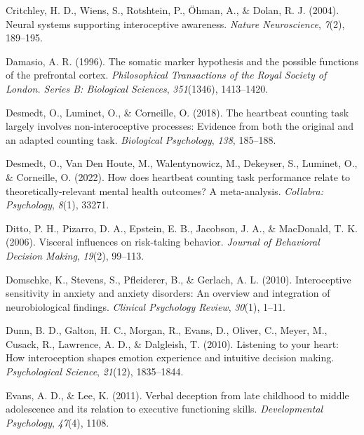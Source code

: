 \documentclass[
  man,mask,floatsintext]{apa6}
\newlength{\cslhangindent}
\newlength{\cslentryspacingunit} %
\newenvironment{CSLReferences}[2] %
 {%
  \setlength{\parindent}{0pt}
  \ifodd #1
  \let\oldpar\par
  \def\par{\hangindent=\cslhangindent\oldpar}
  \fi
  \setlength{\parskip}{#2\cslentryspacingunit}
 }%
 {}
\begin{document}
\begin{CSLReferences}{1}{0}
\leavevmode{}%
Critchley, H. D., Wiens, S., Rotshtein, P., Öhman, A., \& Dolan, R. J. (2004). Neural systems supporting interoceptive awareness. \emph{Nature Neuroscience}, \emph{7}(2), 189--195.

\leavevmode{}%
Damasio, A. R. (1996). The somatic marker hypothesis and the possible functions of the prefrontal cortex. \emph{Philosophical Transactions of the Royal Society of London. Series B: Biological Sciences}, \emph{351}(1346), 1413--1420.

\leavevmode{}%
Desmedt, O., Luminet, O., \& Corneille, O. (2018). The heartbeat counting task largely involves non-interoceptive processes: Evidence from both the original and an adapted counting task. \emph{Biological Psychology}, \emph{138}, 185--188.

\leavevmode{}%
Desmedt, O., Van Den Houte, M., Walentynowicz, M., Dekeyser, S., Luminet, O., \& Corneille, O. (2022). How does heartbeat counting task performance relate to theoretically-relevant mental health outcomes? A meta-analysis. \emph{Collabra: Psychology}, \emph{8}(1), 33271.

\leavevmode{}%
Ditto, P. H., Pizarro, D. A., Epstein, E. B., Jacobson, J. A., \& MacDonald, T. K. (2006). Visceral influences on risk-taking behavior. \emph{Journal of Behavioral Decision Making}, \emph{19}(2), 99--113.

\leavevmode{}%
Domschke, K., Stevens, S., Pfleiderer, B., \& Gerlach, A. L. (2010). Interoceptive sensitivity in anxiety and anxiety disorders: An overview and integration of neurobiological findings. \emph{Clinical Psychology Review}, \emph{30}(1), 1--11.

\leavevmode{}%
Dunn, B. D., Galton, H. C., Morgan, R., Evans, D., Oliver, C., Meyer, M., Cusack, R., Lawrence, A. D., \& Dalgleish, T. (2010). Listening to your heart: How interoception shapes emotion experience and intuitive decision making. \emph{Psychological Science}, \emph{21}(12), 1835--1844.

\leavevmode{}%
Evans, A. D., \& Lee, K. (2011). Verbal deception from late childhood to middle adolescence and its relation to executive functioning skills. \emph{Developmental Psychology}, \emph{47}(4), 1108.


\end{CSLReferences}
\end{document}
